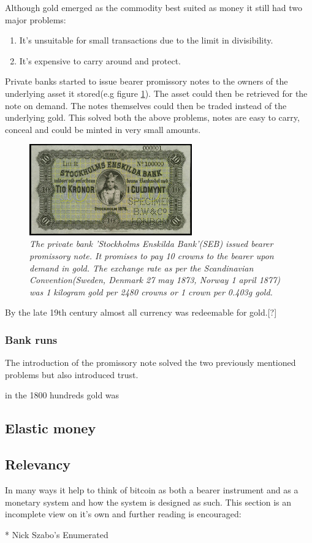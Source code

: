 Although gold emerged as the commodity best suited as money
it still had two major problems:

\begin{enumerate}
	\item It's unsuitable for small transactions due to the limit in divisibility.
	\item It's expensive to carry around and protect.
\end{enumerate}

Private banks started to issue bearer promissory notes to the owners of the underlying asset it stored(e.g figure \ref{fig:seb:promissory:note}). 
The asset could then be retrieved for the note on demand. The notes themselves could then be traded 
instead of the underlying gold. This solved both the above problems, notes are easy to carry, conceal and 
could be minted in very small amounts. 

\begin{figure}[!htb]
	\centering
	\includegraphics[width=7cm]{PrivateBankNoteStockholmEnskildaBank1876.JPG}
	\caption{\textit{The private bank 'Stockholms Enskilda Bank'(SEB) issued bearer
	promissory note. It promises to pay 10 crowns to the bearer upon demand in gold. 
	The exchange rate as per the Scandinavian Convention(Sweden, Denmark 27 may 1873, Norway 1 april 1877)\cite{nordic:crown}
	was 1 kilogram gold per 2480 crowns or 1 crown per 0.403g gold\cite{crown:gold}. 
 }}
	\label{fig:seb:promissory:note}
\end{figure}

By the late 19th century almost all currency was redeemable for gold.[?]

\subsubsection{Bank runs}

The introduction of the promissory note solved the two previously mentioned problems but also 
introduced trust. 
  






in the 1800 hundreds gold was 

\subsection{Elastic money}
\subsection{Relevancy}
In many ways it help to think of bitcoin
as both a bearer instrument and as a monetary system and how the 
system is designed as such. This
section is an incomplete view on it's own and
further reading is encouraged: 

* Nick Szabo's Enumerated 
